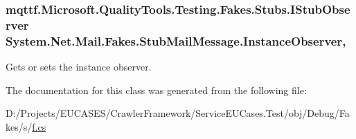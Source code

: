 \hypertarget{class_system_1_1_net_1_1_mail_1_1_fakes_1_1_stub_mail_message_a94688d0f03733c69912766325a25d509}{
\subsubsection[{Instance\-Observer}]{\setlength{\rightskip}{0pt plus 5cm}mqttf.\-Microsoft.\-Quality\-Tools.\-Testing.\-Fakes.\-Stubs.\-I\-Stub\-Observer System.\-Net.\-Mail.\-Fakes.\-Stub\-Mail\-Message.\-Instance\-Observer\hspace{0.3cm}{\ttfamily [get]}, {\ttfamily [set]}}}\label{class_system_1_1_net_1_1_mail_1_1_fakes_1_1_stub_mail_message_a94688d0f03733c69912766325a25d509}


Gets or sets the instance observer.



The documentation for this class was generated from the following file\-:\begin{DoxyCompactItemize}
\item 
D\-:/\-Projects/\-E\-U\-C\-A\-S\-E\-S/\-Crawler\-Framework/\-Service\-E\-U\-Cases.\-Test/obj/\-Debug/\-Fakes/s/\hyperlink{s_2f_8cs}{f.\-cs}\end{DoxyCompactItemize}
